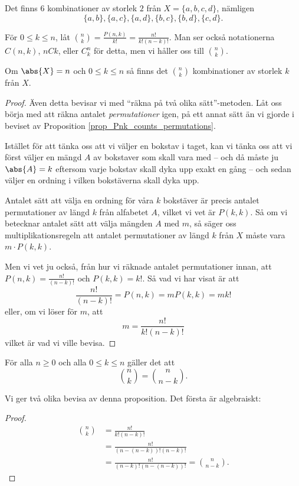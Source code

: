\documentclass{tufte-handout}
\begin{document}
\begin{example}
	Det finns $6$ kombinationer av storlek $2$ från $X = \{a,b,c,d\}$, nämligen
	$$\{a,b\}, \{a,c\},\{a,d\},\{b,c\},\{b,d\},\{c,d\}.$$
\end{example}

\begin{definition}
	För $0 \leq k \leq n$, låt $\binom{n}{k} = \frac{P(n,k)}{k!} = \frac{n!}{k!(n-k)!}$. Man ser också notationerna $C(n,k)$, $nCk$, eller $C^n_k$ för detta, men vi håller oss till $\binom{n}{k}$. 
\end{definition}

\begin{proposition}
	Om $\abs{X} = n$ och $0 \leq k \leq n$ så finns det $\binom{n}{k}$ kombinationer av storlek $k$ från $X$.
	\begin{proof}
		Även detta bevisar vi med ``räkna på två olika sätt''-metoden. Låt oss börja med att räkna antalet \emph{permutationer} igen, på ett annat sätt än vi gjorde i beviset av Proposition \ref{prop_Pnk_counts_permutations}.

		Istället för att tänka oss att vi väljer en bokstav i taget, kan vi tänka oss att vi först väljer en mängd $A$ av bokstaver som skall vara med -- och då måste ju $\abs{A} = k$ eftersom varje bokstav skall dyka upp exakt en gång -- och sedan väljer en ordning i vilken bokstäverna skall dyka upp.

		Antalet sätt att välja en ordning för våra $k$ bokstäver är precis antalet permutationer av längd $k$ från alfabetet $A$, vilket vi vet är $P(k,k)$. Så om vi betecknar antalet sätt att välja mängden $A$ med $m$, så säger oss multiplikationsregeln att antalet permutationer av längd $k$ från $X$ måste vara $m\cdot P(k,k)$.

		Men vi vet ju också, från hur vi räknade antalet permutationer innan, att $P(n,k) = \frac{n!}{(n-k)!}$ och $P(k,k) = k!$. Så vad vi har visat är att
		$$\frac{n!}{(n-k)!} = P(n,k) = m P(k,k) = m k!$$
		eller, om vi löser för $m$, att
		$$m = \frac{n!}{k!(n-k)!}$$
		vilket är vad vi ville bevisa.
	\end{proof}
\end{proposition}

\begin{proposition}
	För alla $n \geq 0$ och alla $0 \leq k \leq n$ gäller det att
	$$\binom{n}{k} = \binom{n}{n-k}.$$
\end{proposition}

Vi ger två olika bevisa av denna proposition. Det första är algebraiskt:
\begin{proof}
	\begin{align*}
		\binom{n}{k} &= \frac{n!}{k!(n-k)!}\\
		&= \frac{n!}{(n-(n-k))!(n-k)!}\\
		&= \frac{n!}{(n-k)!(n-(n-k))!} = \binom{n}{n-k}.
	\end{align*}
\end{proof}
\end{document}
